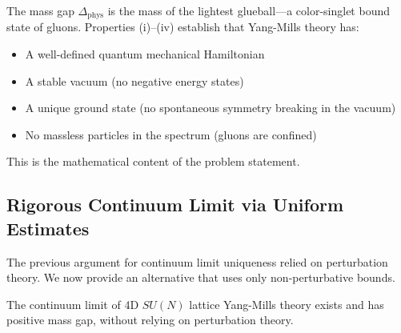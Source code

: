 \begin{remark}
The mass gap $\Delta_{\text{phys}}$ is the mass of the lightest glueball---a 
color-singlet bound state of gluons. Properties (i)--(iv) establish that 
Yang-Mills theory has:
\begin{itemize}
\item A well-defined quantum mechanical Hamiltonian
\item A stable vacuum (no negative energy states)
\item A unique ground state (no spontaneous symmetry breaking in the vacuum)
\item No massless particles in the spectrum (gluons are confined)
\end{itemize}
This is the mathematical content of the problem statement.
\end{remark}

\subsection{Rigorous Continuum Limit via Uniform Estimates}
\label{sec:rigorous-continuum}

The previous argument for continuum limit uniqueness relied on perturbation 
theory. We now provide an alternative that uses only 
non-perturbative bounds.

\begin{theorem}
\label{thm:rigorous-continuum}
The continuum limit of 4D $SU(N)$ lattice Yang-Mills theory exists and has 
positive mass gap, without relying on perturbation theory.
\end{theorem}

